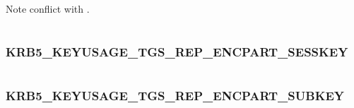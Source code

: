 \documentclass[letterpaper,10pt,english]{sphinxmanual}
\begin{document}
Note conflict with  .

\begin{tabulary}{\linewidth}{|L|L|}
\hline

 & 
\\
\hline\end{tabulary}



\subsubsection{KRB5\_KEYUSAGE\_TGS\_REP\_ENCPART\_SESSKEY}
\label{appdev/refs/macros/KRB5_KEYUSAGE_TGS_REP_ENCPART_SESSKEY:krb5-keyusage-tgs-rep-encpart-sesskey}\label{appdev/refs/macros/KRB5_KEYUSAGE_TGS_REP_ENCPART_SESSKEY:krb5-keyusage-tgs-rep-encpart-sesskey-data}\label{appdev/refs/macros/KRB5_KEYUSAGE_TGS_REP_ENCPART_SESSKEY::doc}

\begin{fulllineitems}
\label{appdev/refs/macros/KRB5_KEYUSAGE_TGS_REP_ENCPART_SESSKEY:KRB5_KEYUSAGE_TGS_REP_ENCPART_SESSKEY}
\end{fulllineitems}


\begin{tabulary}{\linewidth}{|L|L|}
\hline

 & 
\\
\hline\end{tabulary}



\subsubsection{KRB5\_KEYUSAGE\_TGS\_REP\_ENCPART\_SUBKEY}
\label{appdev/refs/macros/KRB5_KEYUSAGE_TGS_REP_ENCPART_SUBKEY:krb5-keyusage-tgs-rep-encpart-subkey-data}\label{appdev/refs/macros/KRB5_KEYUSAGE_TGS_REP_ENCPART_SUBKEY::doc}\label{appdev/refs/macros/KRB5_KEYUSAGE_TGS_REP_ENCPART_SUBKEY:krb5-keyusage-tgs-rep-encpart-subkey}

\begin{fulllineitems}
\label{appdev/refs/macros/KRB5_KEYUSAGE_TGS_REP_ENCPART_SUBKEY:KRB5_KEYUSAGE_TGS_REP_ENCPART_SUBKEY}
\end{fulllineitems}
\end{document}
